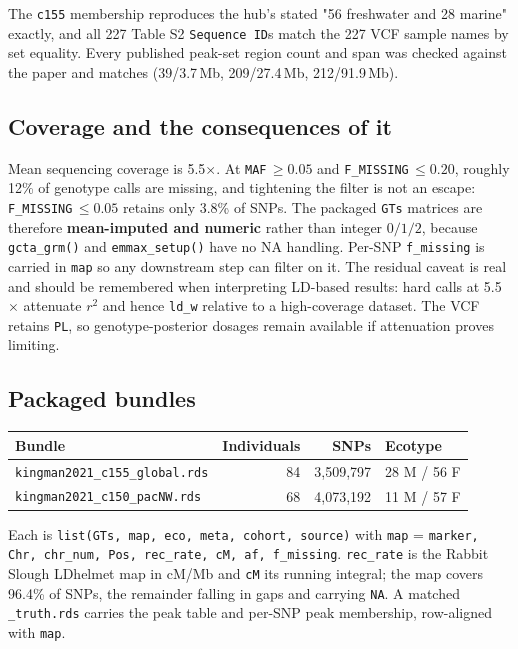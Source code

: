 \documentclass[11pt,a4paper]{article}
\begin{document}
The \texttt{c155} membership reproduces the hub's stated "56 freshwater and 28 marine"
exactly, and all 227 Table S2 \texttt{Sequence ID}s match the 227 VCF sample names by set
equality. Every published peak-set region count and span was checked against the paper and
matches (39/3.7\,Mb, 209/27.4\,Mb, 212/91.9\,Mb).

\subsection{Coverage and the consequences of it}

Mean sequencing coverage is 5.5$\times$. At \texttt{MAF}$\,\geq0.05$ and
\texttt{F\_MISSING}$\,\leq0.20$, roughly 12\% of genotype calls are missing, and tightening
the filter is not an escape: \texttt{F\_MISSING}$\,\leq0.05$ retains only 3.8\% of SNPs.
The packaged \texttt{GTs} matrices are therefore \textbf{mean-imputed and numeric} rather
than integer $0/1/2$, because \texttt{gcta\_grm()} and \texttt{emmax\_setup()} have no NA
handling. Per-SNP \texttt{f\_missing} is carried in \texttt{map} so any downstream step can
filter on it. The residual caveat is real and should be remembered when interpreting
LD-based results: hard calls at 5.5$\times$ attenuate $r^2$ and hence \texttt{ld\_w}
relative to a high-coverage dataset. The VCF retains \texttt{PL}, so genotype-posterior
dosages remain available if attenuation proves limiting.

\subsection{Packaged bundles}

\begin{table}[h]\centering\small
\begin{tabular}{lrrl}\toprule
Bundle & Individuals & SNPs & Ecotype \\ \midrule
\texttt{kingman2021\_c155\_global.rds} & 84 & 3{,}509{,}797 & 28 M / 56 F \\
\texttt{kingman2021\_c150\_pacNW.rds}  & 68 & 4{,}073{,}192 & 11 M / 57 F \\ \bottomrule
\end{tabular}
\end{table}

Each is \texttt{list(GTs, map, eco, meta, cohort, source)} with \texttt{map} =
\texttt{marker, Chr, chr\_num, Pos, rec\_rate, cM, af, f\_missing}. \texttt{rec\_rate} is
the Rabbit Slough LDhelmet map in cM/Mb and \texttt{cM} its running integral; the map covers
96.4\% of SNPs, the remainder falling in gaps and carrying \texttt{NA}. A matched
\texttt{\_truth.rds} carries the peak table and per-SNP peak membership, row-aligned with
\texttt{map}.
\end{document}
